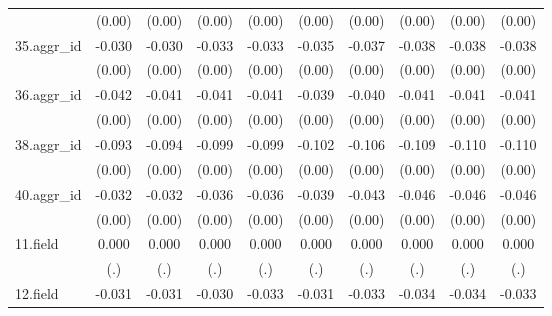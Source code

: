 {\begin{tabular}{l*{9}{c}}
          &   (0.00)         &   (0.00)         &   (0.00)         &   (0.00)         &   (0.00)         &   (0.00)         &   (0.00)         &   (0.00)         &   (0.00)         \\
[1em]
35.aggr\_id&   -0.030\sym{***}&   -0.030\sym{***}&   -0.033\sym{***}&   -0.033\sym{***}&   -0.035\sym{***}&   -0.037\sym{***}&   -0.038\sym{***}&   -0.038\sym{***}&   -0.038\sym{***}\\
          &   (0.00)         &   (0.00)         &   (0.00)         &   (0.00)         &   (0.00)         &   (0.00)         &   (0.00)         &   (0.00)         &   (0.00)         \\
[1em]
36.aggr\_id&   -0.042\sym{***}&   -0.041\sym{***}&   -0.041\sym{***}&   -0.041\sym{***}&   -0.039\sym{***}&   -0.040\sym{***}&   -0.041\sym{***}&   -0.041\sym{***}&   -0.041\sym{***}\\
          &   (0.00)         &   (0.00)         &   (0.00)         &   (0.00)         &   (0.00)         &   (0.00)         &   (0.00)         &   (0.00)         &   (0.00)         \\
[1em]
38.aggr\_id&   -0.093\sym{***}&   -0.094\sym{***}&   -0.099\sym{***}&   -0.099\sym{***}&   -0.102\sym{***}&   -0.106\sym{***}&   -0.109\sym{***}&   -0.110\sym{***}&   -0.110\sym{***}\\
          &   (0.00)         &   (0.00)         &   (0.00)         &   (0.00)         &   (0.00)         &   (0.00)         &   (0.00)         &   (0.00)         &   (0.00)         \\
[1em]
40.aggr\_id&   -0.032\sym{***}&   -0.032\sym{***}&   -0.036\sym{***}&   -0.036\sym{***}&   -0.039\sym{***}&   -0.043\sym{***}&   -0.046\sym{***}&   -0.046\sym{***}&   -0.046\sym{***}\\
          &   (0.00)         &   (0.00)         &   (0.00)         &   (0.00)         &   (0.00)         &   (0.00)         &   (0.00)         &   (0.00)         &   (0.00)         \\
[1em]
11.field  &    0.000         &    0.000         &    0.000         &    0.000         &    0.000         &    0.000         &    0.000         &    0.000         &    0.000         \\
          &      (.)         &      (.)         &      (.)         &      (.)         &      (.)         &      (.)         &      (.)         &      (.)         &      (.)         \\
[1em]
12.field  &   -0.031\sym{***}&   -0.031\sym{***}&   -0.030\sym{***}&   -0.033\sym{***}&   -0.031\sym{***}&   -0.033\sym{***}&   -0.034\sym{***}&   -0.034\sym{***}&   -0.033\sym{***}\\

\end{tabular}}
